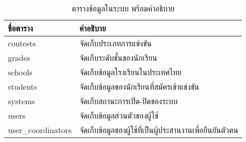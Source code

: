 \begin{table}[H]
    \caption{ตารางข้อมูลในระบบ พร้อมคำอธิบาย}
    \label{tab:database}
    \begin{tabularx}{\textwidth}{ | p{3cm} | X | }
    \hline
    \textbf{ชื่อตาราง} & \textbf{คำอธิบาย} \\
    \hline
    contests & จัดเก็บประเภทการแข่งขัน \\
    \hline
    grades & จัดเก็บระดับชั้นของนักเรียน \\
    \hline
    schools & จัดเก็บข้อมูลโรงเรียนในประเทศไทย \\
    \hline
    students & จัดเก็บข้อมูลของนักเรียนที่สมัครเข้าแข่งขัน \\
    \hline
    systems & จัดเก็บสถานะการเปิด-ปิดของระบบ \\
    \hline
    users & จัดเก็บข้อมูลส่วนตัวของผู้ใช้ \\
    \hline
    user\_coordinators & จัดเก็บข้อมูลของผู้ใช้ที่เป็นผู้ประสานงานเพื่อยืนยันตัวตน \\
    \hline
    \end{tabularx}
\end{table}
    